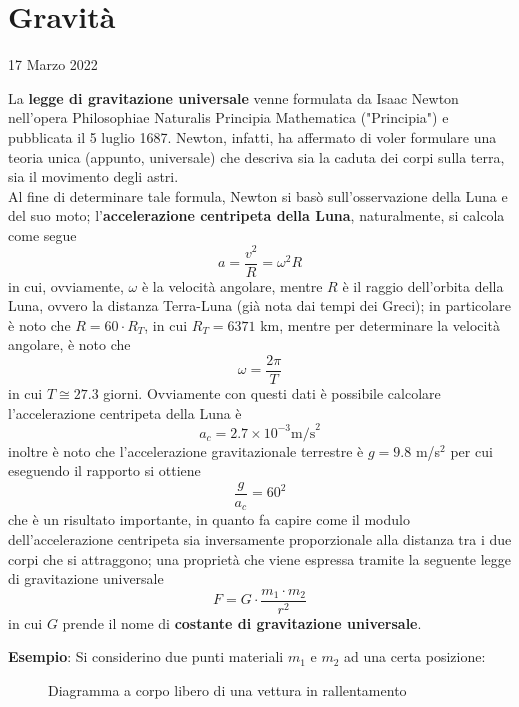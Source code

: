 \documentclass[a4paper]{extarticle}
\begin{document}
\newpage
\section{Gravità}
\noindent
\begin{center}
  17 Marzo 2022
\end{center}
La \textbf{legge di gravitazione universale} venne formulata da Isaac Newton nell'opera Philosophiae Naturalis Principia Mathematica ("Principia") e pubblicata il 5 luglio 1687. Newton, infatti, ha affermato di voler formulare una teoria unica (appunto, universale) che descriva sia la caduta dei corpi sulla terra, sia il movimento degli astri.\\
Al fine di determinare tale formula, Newton si basò sull'osservazione della Luna e del suo moto; l'\textbf{accelerazione centripeta della Luna}, naturalmente, si calcola come segue
\[a = \frac{v^2}{R} = \omega^2 R\]
in cui, ovviamente, $\omega$ è la velocità angolare, mentre $R$ è il raggio dell'orbita della Luna, ovvero la distanza Terra-Luna (già nota dai tempi dei Greci); in particolare è noto che $R = 60 \cdot R_T$, in cui $R_T = 6371$ km, mentre per determinare la velocità angolare, è noto che
\[\omega = \frac{2\pi}{T}\]
in cui $T \cong 27.3$ giorni. Ovviamente con questi dati è possibile calcolare l'accelerazione centripeta della Luna è
\[a_c = 2.7 \times 10^{-3} \text{m/s}^2\]
inoltre è noto che l'accelerazione gravitazionale terrestre è $g=9.8$ m/s$^2$ per cui eseguendo il rapporto si ottiene
\[\frac{g}{a_c} = 60^2\]
che è un risultato importante, in quanto fa capire come il modulo dell'accelerazione centripeta sia inversamente proporzionale alla distanza tra i due corpi che si attraggono; una proprietà che viene espressa tramite la seguente legge di gravitazione universale
\[\boxed{F = G \cdot \frac{m_1 \cdot m_2}{r^2}}\]
in cui $G$ prende il nome di \textbf{costante di gravitazione universale}.

\vspace{1em}
\noindent
\textbf{Esempio}: Si considerino due punti materiali $m_1$ e $m_2$ ad una certa posizione:

\vspace{1em}
\begin{figure}[H]
  \centering
  \caption{Diagramma a corpo libero di una vettura in rallentamento}
  \label{fig:diagramma_corpo_libero_vettura_rallentamento}
\end{figure}
\end{document}
